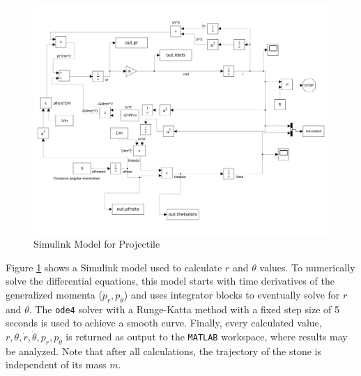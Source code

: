 \documentclass[aps,twocolumn]{revtex4-1}
\begin{document}
\begin{figure}
    \centering
    \includegraphics[width=.5\textwidth]{projectile.jpg}
    \caption{Simulink Model for Projectile}
    \label{simulink}
\end{figure}
Figure \ref{simulink} shows a Simulink model used to calculate $r$ and $\theta$ values. To numerically solve the differential equations, this model starts with time derivatives of the generalized momenta ($\dot p_r, \dot p_\theta$) and uses integrator blocks to eventually solve for $r$ and $\theta$. The \verb|ode4| solver with a Runge-Katta method with a fixed step size of 5 seconds is used to achieve a smooth curve. Finally, every calculated value, $r,\theta,\dot{r},\dot{\theta},p_r,p_\theta$ is returned as output to the \verb|MATLAB| workspace, where results may be analyzed. Note that after all calculations, the trajectory of the stone is independent of its mass $m$.
\end{document}
